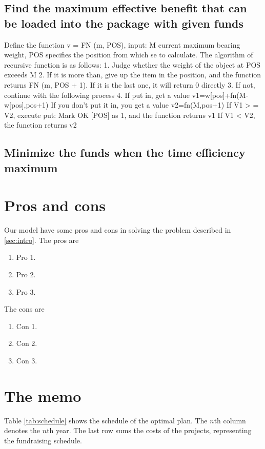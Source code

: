\documentclass{article}
\begin{document}
\subsection{Find the maximum effective benefit that can be loaded into the package with given funds}
Define the function v = FN (m, POS), input: M current maximum bearing weight, POS specifies the position from which se to calculate.
The algorithm of recursive function is as follows:
1. Judge whether the weight of the object at POS exceeds M
2. If it is more than, give up the item in the position, and the function returns FN (m, POS + 1). If it is the last one, it will return 0 directly
3. If not, continue with the following process
4. If put in, get a value
v1=w[pos]+fn(M-w[pos],pos+1)
If you don't put it in, you get a value
v2=fn(M,pos+1)
If V1 > = V2, execute put: Mark OK [POS] as 1, and the function returns v1
If V1 < V2, the function returns v2
\subsection{Minimize the funds when the time efficiency maximum}


\section{Pros and cons}
Our model have some pros and cons in solving the problem described in \ref{sec:intro}.
The pros are
\begin{enumerate}
\item Pro 1.
\item Pro 2.
\item Pro 3.
\end{enumerate}

The cons are
\begin{enumerate}
\item Con 1.
\item Con 2.
\item Con 3.
\end{enumerate}


\newpage

\section{The memo}
\label{sec:memo}

Table \ref{tab:schedule} shows the schedule of the optimal plan.
The $n$th column denotes the $n$th year.
The last row sums the costs of the projects, representing the fundraising schedule.
\end{document}
